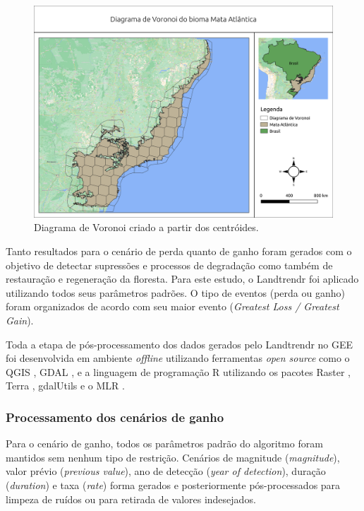 \documentclass[12pt,a4paper]{article}
\begin{document}
\begin{figure}[H]
    \centering
    \includegraphics[scale=.5]{images/voronoi_mata_atlantica.png}
    \caption{Diagrama de Voronoi criado a partir dos centróides.}
    \label{fig:voronoi_ma}
\end{figure}

Tanto resultados para o cenário de perda quanto de ganho foram gerados com o objetivo de detectar supressões e processos de degradação como também de restauração e regeneração da floresta. Para este estudo, o Landtrendr foi aplicado utilizando todos seus parâmetros padrões. O tipo de eventos (perda ou ganho) foram organizados de acordo com seu maior evento (\textit{Greatest Loss / Greatest Gain}).

Toda a etapa de pós-processamento dos dados gerados pelo Landtrendr no GEE foi desenvolvida em ambiente \textit{offline} utilizando ferramentas \textit{open source} como o QGIS \citep{QGIS_software}, GDAL \citep{gdal}, e a linguagem de programação R \citep{Rsoftware} utilizando os pacotes Raster \citep{raster}, Terra \cite{terra}, gdalUtils \citep{gdalutils} e o MLR \citep{mlr}.

\subsubsection{Processamento dos cenários de ganho}
\hspace{13pt} Para o cenário de ganho, todos os parâmetros padrão do algoritmo foram mantidos sem nenhum tipo de restrição. Cenários de magnitude (\textit{magnitude}), valor prévio (\textit{previous value}), ano de detecção (\textit{year of detection}), duração (\textit{duration}) e taxa (\textit{rate}) forma gerados e posteriormente pós-processados para limpeza de ruídos ou para retirada de valores indesejados. 
\end{document}
